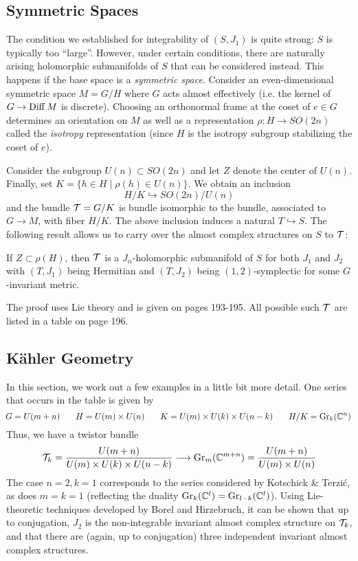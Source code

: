 \documentclass{scrartcl}
\begin{document}
\subsection{Symmetric Spaces}

The condition we established for integrability of $(S,J_1)$ is quite strong: $S$ is typically too ``large''. However, under certain conditions, there are naturally arising holomorphic submanifolds of $S$ that can be considered instead. This happens if the base space is a \emph{symmetric space}. Consider an even-dimensional symmetric space $M=G/H$ where $G$ acts almost effectively (i.e. the kernel of $G\to \operatorname{Diff} M$ is discrete). Choosing an orthonormal frame at the coset of $e\in G$ determines an orientation on $M$ as well as a representation $\rho:H\to SO(2n)$ called the \emph{isotropy} representation (since $H$ is the isotropy subgroup stabilizing the coset of $e$).

Consider the subgroup $U(n)\subset SO(2n)$ and let $Z$ denote the center of $U(n)$. Finally, set $K=\{h\in H\mid \rho(h)\in U(n)\}$. We obtain an inclusion
\begin{equation*}
H/K \hookrightarrow SO(2n)/U(n)
\end{equation*} 
and the bundle $\mathcal{T}=G/K$ is bundle isomorphic to the bundle, associated to $G\to M$, with fiber $H/K$. The above inclusion induces a natural $T\hookrightarrow S$. The following result allows us to carry over the almost complex structures on $S$ to $\mathcal{T}$:

\begin{thm}\label{thm:symmetric}
	If $Z\subset \rho(H)$, then $\mathcal{T}$ is a $J_\alpha$-holomorphic submanifold of $S$ for both $J_1$ and $J_2$ with $(T,J_1)$ being Hermitian and $(T,J_2)$ being $(1,2)$-symplectic for some $G$-invariant metric.
\end{thm}
The proof uses Lie theory and is given on pages 193-195. All possible such $\mathcal{T}$ are listed in a table on page 196.

\subsection{K\"{a}hler Geometry}

In this section, we work out a few examples in a little bit more detail. One series that occurs in the table is given by
\begin{equation*}
\!G=U(m+n)\qquad\! H=U(m)\times U(n)\qquad\! K=U(m)\times U(k)\times U(n-k) 
\qquad\! H/K=\operatorname{Gr}_k(\mathbb{C}^n)
\end{equation*}
Thus, we have a twistor bundle
\begin{equation*}
\mathcal{T}_k=\frac{U(m+n)}{U(m)\times U(k)\times U(n-k)}\longrightarrow \operatorname{Gr}_m(\mathbb{C}^{m+n})
=\frac{U(m+n)}{U(m)\times U(n)}
\end{equation*}
The case $n=2,k=1$ corresponds to the series considered by Kotschick \& Terzi\'{c}, as does $m=k=1$ (reflecting the duality $\operatorname{Gr}_k(\mathbb{C}^l)=\operatorname{Gr}_{l-k}(\mathbb{C}^l)$). Using Lie-theoretic techniques developed by Borel and Hirzebruch, it can be shown that up to conjugation, $J_2$ is the non-integrable invariant almost complex structure on $\mathcal{T}_k$, and that there are (again, up to conjugation) three independent invariant almost complex structures. 
\end{document}
